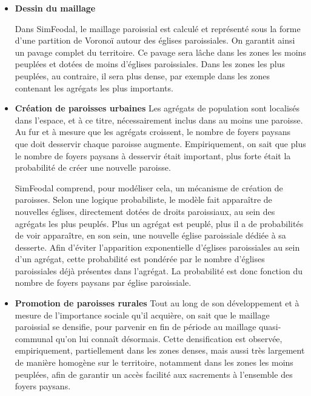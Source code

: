\begin{itemize}
	\item \textbf{Dessin du maillage}
		\begin{tcolorbox}[breakable,left=0pt,right=0pt,top=0pt,bottom=0pt,
		colback=gray!15,colframe=gray!15,width=\dimexpr0.94\textwidth\relax, 
		enlarge left by=0mm, boxsep=5pt,arc=0pt,outer arc=0pt]
			Dans SimFeodal, le maillage paroissial est calculé et représenté sous la forme d'une partition de Voronoï autour des églises paroissiales.
			On garantit ainsi un pavage complet du territoire.
			Ce pavage sera lâche dans les zones les moins peuplées et dotées de 	moins d'églises paroissiales.
			Dans les zones les plus peuplées, au contraire, il sera plus dense, par exemple dans les zones contenant les agrégats les plus importants.
	\end{tcolorbox}
	
	\item \textbf{Création de paroisses \og urbaines\fg{}} Les agrégats de population sont localisés dans l'espace, et à ce titre, nécessairement inclus dans au moins une paroisse.
	Au fur et à mesure que les agrégats croissent, le nombre de foyers paysans que doit desservir chaque paroisse augmente.
	Empiriquement, on sait que plus le nombre de foyers paysans à desservir était important, plus forte était la probabilité de créer une nouvelle paroisse.
	
	\begin{tcolorbox}[breakable,left=0pt,right=0pt,top=0pt,bottom=0pt,
		colback=gray!15,colframe=gray!15,width=\dimexpr0.94\textwidth\relax, 
		enlarge left by=0mm, boxsep=5pt,arc=0pt,outer arc=0pt]
	SimFeodal comprend, pour modéliser cela, un mécanisme de création de paroisses.
	Selon une logique probabiliste, le modèle fait apparaître de nouvelles églises, directement dotées de droits paroissiaux, au sein des agrégats les plus peuplés.
	Plus un agrégat est peuplé, plus il a de probabilités de voir apparaître, en son sein, une nouvelle église paroissiale dédiée à sa desserte.	
	Afin d'éviter l'apparition exponentielle d'églises paroissiales au sein d'un agrégat, cette probabilité est pondérée par le nombre d'églises paroissiales déjà présentes dans l'agrégat.
	La probabilité est donc fonction du nombre de foyers paysans par église paroissiale.
\end{tcolorbox}
	
	\item \textbf{Promotion de paroisses \og rurales\fg{}} Tout au long de son développement et à mesure de l'importance sociale qu'il acquière, on sait que le maillage paroissial se densifie, pour parvenir en fin de période au maillage quasi-communal qu'on lui connaît désormais.
	Cette densification est observée, empiriquement, partiellement dans les zones denses, mais aussi très largement de manière homogène sur le territoire, notamment dans les zones les moins peuplées, afin de garantir un accès facilité aux sacrements à l'ensemble des foyers paysans.
	

\end{itemize}

